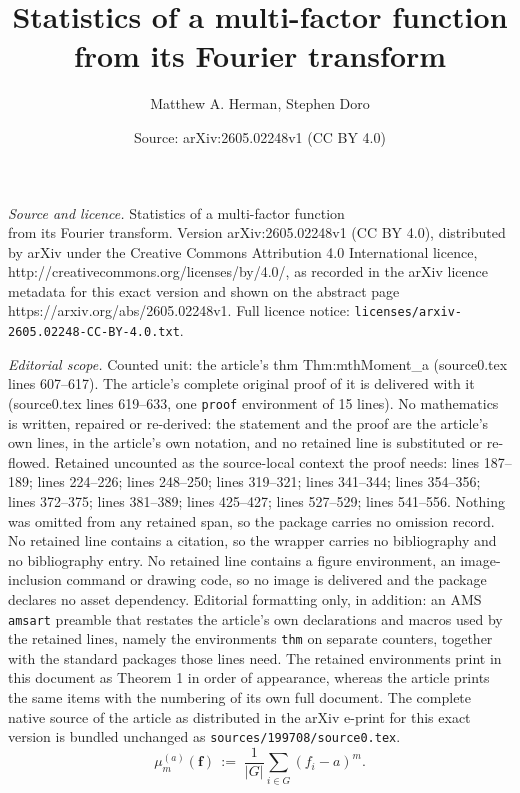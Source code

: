 \documentclass[10pt,a4paper]{amsart}
\title{Statistics of a multi-factor function\\ from its Fourier transform}
\author{Matthew A. Herman, Stephen Doro}
\date{Source: arXiv:2605.02248v1 (CC BY 4.0)}
\newcommand{\abs}[1]{\vert #1 \vert}
\newcommand{\bs}[1]{{\boldsymbol{#1}}}
\newcommand{\dimin}[2]{{ #1 }^{\gr{#2}}}
\newcommand{\gr}[1]{( #1 )}
\begin{document}
\maketitle

\noindent\emph{Source and licence.} Statistics of a multi-factor function\\ from its Fourier transform. Version arXiv:2605.02248v1 (CC BY 4.0), distributed by arXiv under the Creative Commons Attribution 4.0 International licence, http://creativecommons.org/licenses/by/4.0/, as recorded in the arXiv licence metadata for this exact version and shown on the abstract page https://arxiv.org/abs/2605.02248v1. Full licence notice: \texttt{licenses/arxiv-2605.02248-CC-BY-4.0.txt}.\par\smallskip

\noindent\textit{Editorial scope.} Counted unit: the article's thm Thm:mthMoment\_a (source0.tex lines 607--617). The article's complete original proof of it is delivered with it (source0.tex lines 619--633, one \texttt{proof} environment of 15 lines). No mathematics is written, repaired or re-derived: the statement and the proof are the article's own lines, in the article's own notation, and no retained line is substituted or re-flowed.  Retained uncounted as the source-local context the proof needs: lines 187--189; lines 224--226; lines 248--250; lines 319--321; lines 341--344; lines 354--356; lines 372--375; lines 381--389; lines 425--427; lines 527--529; lines 541--556.  Nothing was omitted from any retained span, so the package carries no omission record.  No retained line contains a citation, so the wrapper carries no bibliography and no bibliography entry.  No retained line contains a figure environment, an image-inclusion command or drawing code, so no image is delivered and the package declares no asset dependency.  Editorial formatting only, in addition: an AMS \texttt{amsart} preamble that restates the article's own declarations and macros used by the retained lines, namely the environments \texttt{thm} on separate counters, together with the standard packages those lines need.  The retained environments print in this document as Theorem 1 in order of appearance, whereas the article prints the same items with the numbering of its own full document.  The complete native source of the article as distributed in the arXiv e-print for this exact version is bundled unchanged as \texttt{sources/199708/source0.tex}.
\begin{equation} \label{Def:mthMoment_a}
\dimin{\mu}{a}_m\gr{\bs{f}} \,:=\; \frac{1}{\abs{G}} \sum_{i\in G} \gr{f_i-a}^m.
\end{equation}
\end{document}
